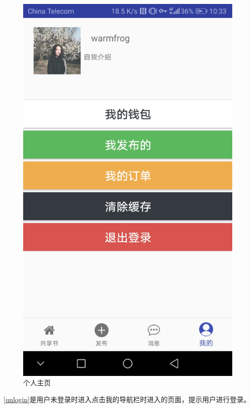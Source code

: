 \begin{figure}[h]
	\centering
	\includegraphics[scale=0.09]{Chapters/UI/self_intro.jpg}
	\caption{个人主页}
	\label{self_intro}
\end{figure}

\cref{unlogin}是用户未登录时进入点击我的导航栏时进入的页面，提示用户进行登录。

